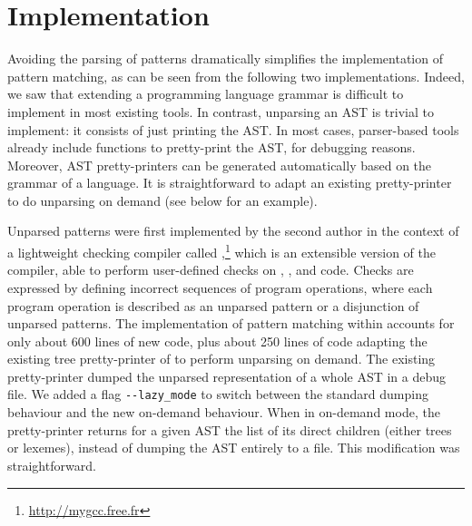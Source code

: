 
\section{Implementation}
\label{implementation}

Avoiding the parsing of patterns dramatically simplifies the
implementation of pattern matching, as can be seen from the following
two implementations. Indeed, we saw that extending a programming
language grammar is difficult to implement in most existing tools. In
contrast, unparsing an AST is trivial to implement: it consists of
just printing the AST. In most cases, parser\hyp{}based tools already
include functions to pretty\hyp{}print the AST, for debugging
reasons. Moreover, AST pretty\hyp{}printers can be generated
automatically based on the grammar of a language. It is
straightforward to adapt an existing pretty\hyp{}printer to do
unparsing on demand (see below for an example).

Unparsed patterns were first implemented by the second author in the
context of a lightweight checking compiler called
\MyGCC,\footnote{\url{http://mygcc.free.fr}} which is an extensible
version of the \GCC compiler, able to perform user\hyp{}defined checks
on \Clang, \cpp, and \Ada code. Checks are expressed by defining
incorrect sequences of program operations, where each program
operation is described as an unparsed pattern or a disjunction of
unparsed patterns. The implementation of pattern matching within
\MyGCC accounts for only about 600 lines of new \Clang code, plus
about 250 lines of code adapting the existing tree pretty\hyp{}printer
of \GCC to perform unparsing on demand. The existing
pretty\hyp{}printer dumped the unparsed representation of a whole AST
in a debug file. We added a flag \verb|--lazy_mode| to switch between
the standard dumping behaviour and the new on\hyp{}demand
behaviour. When in on\hyp{}demand mode, the pretty\hyp{}printer
returns for a given AST the list of its direct children (either trees
or lexemes), instead of dumping the AST entirely to a file. This
modification was straightforward.

